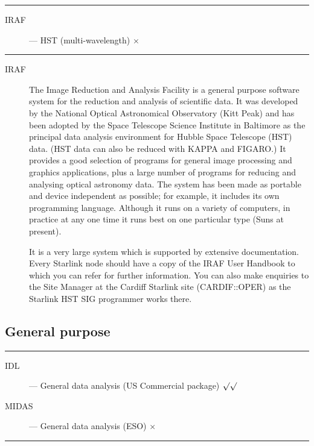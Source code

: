 \rule{\textwidth}{0.5mm}
\begin{description}
\begin{description}
\item [IRAF] --- HST (multi-wavelength) \hfill $\times$
\end{description}
\end{description}
\rule{\textwidth}{0.5mm}

\begin{description}

\item [IRAF] \mbox{}

The Image Reduction and Analysis Facility is a general purpose software system
for the reduction and analysis of scientific data.
It was developed by the National Optical Astronomical Observatory (Kitt Peak)
and has been adopted by the Space Telescope Science Institute in Baltimore as
the principal data analysis environment for Hubble Space Telescope (HST) data.
(HST data can also be reduced with KAPPA and FIGARO.)
It provides a good selection of programs for general image processing and
graphics applications, plus a large number of programs for reducing and
analysing optical astronomy data.
The system has been made as portable and device independent as possible; for
example, it includes its own programming language.
Although it runs on a variety of computers, in practice at any one time it runs
best on one particular type (Suns at present).

It is a very large system which is supported by extensive documentation.
Every Starlink node should have a copy of the IRAF User Handbook to which
you can refer for further information.
You can also make enquiries to the Site Manager at the Cardiff Starlink
site (CARDIF::OPER) as the Starlink HST SIG programmer works there.

\end{description}

\newpage

\subsection{General purpose}

\rule{\textwidth}{0.5mm}
\begin{description}
\begin{description}
\item [IDL] --- General data analysis (US Commercial package) \hfill 
 $\surd\surd$
\item [MIDAS] --- General data analysis (ESO) \hfill $\times$
\end{description}
\end{description}
\rule{\textwidth}{0.5mm}

